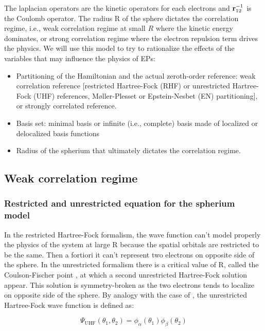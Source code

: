 \documentclass[11pt,a4paper]{article}
\begin{document}
{The laplacian operators are the kinetic operators for each electrons and $\vb{r}_{12}^{-1}$ is the Coulomb operator. The radius R of the sphere dictates the correlation regime, i.e., weak correlation regime at small $R$ where the kinetic energy dominates, or strong correlation regime where the electron repulsion term drives the physics. We will use this model to try to rationalize the effects of the variables that may influence the physics of EPs:
\begin{itemize}
	\item Partitioning of the Hamiltonian and the actual zeroth-order reference: weak correlation reference [restricted Hartree-Fock (RHF) or unrestricted Hartree-Fock (UHF) references, M{\o}ller-Plesset or Epstein-Nesbet (EN) partitioning], or strongly correlated reference.
	\item Basis set: minimal basis or infinite (i.e., complete) basis made of localized or delocalized basis functions
	\item Radius of the spherium that ultimately dictates the correlation regime.
\end{itemize}

\subsection{Weak correlation regime}

\subsubsection{Restricted and unrestricted equation for the  spherium model}

In the restricted Hartree-Fock formalism, the wave function can't model properly the physics of the system at large R because the spatial orbitals are restricted to be the same. Then a fortiori it can't represent two electrons on opposite side of the sphere. In the unrestricted formalism there is a critical value of R, called the Coulson-Fischer point \cite{Coulson_1949}, at which a second unrestricted Hartree-Fock solution appear. This solution is symmetry-broken as the two electrons tends to localize on opposite side of the sphere. By analogy with the case of  \cite{SzaboBook}, the unrestricted Hartree-Fock wave function is defined as:

\begin{equation}
\Psi_{\text{UHF}}(\theta_1,\theta_2)=\phi_\alpha(\theta_1)\phi_\beta(\theta_2)
\end{equation}

}
\end{document}
